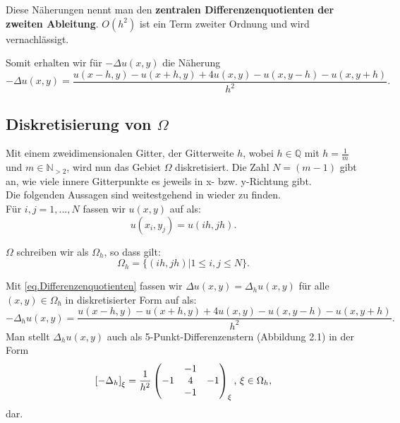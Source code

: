 Diese Näherungen nennt man den \textbf{zentralen Differenzenquotienten der zweiten Ableitung}. $O(h^{2})$ ist ein Term zweiter Ordnung und wird vernachlässigt.

Somit erhalten wir für $-\Delta u(x,y)$ die Näherung
\begin{equation}
-\Delta u(x,y) = \frac {u(x-h,y) - u(x+h,y) + 4u(x,y) - u(x,y-h) - u(x,y+h)} {h^{2}}.\label{eq.Differenzenquotienten}
\end{equation}

\subsection{Diskretisierung von $\Omega$}\label{ss.Diskretisierung}

Mit einem zweidimensionalen Gitter, der Gitterweite $h$, wobei $h \in \mathbb{Q}$ mit $h = \frac {1} {m}$ und $m \in \mathbb{N}_{>2}$, wird nun das Gebiet $\Omega$ diskretisiert. Die Zahl $N = (m-1)$ gibt an, wie viele innere Gitterpunkte es jeweils in x- bzw. y-Richtung gibt.\\
Die folgenden Aussagen sind weitestgehend in \cite{DR1} wieder zu finden.\\

Für $i,j = 1,...,N$ fassen wir $u(x,y)$ auf als:
\begin{equation}
u(x_{i},y_{j}) = u(ih,jh).
\end{equation}

$\Omega$ schreiben wir als $\Omega_{h}$, so dass gilt:
\begin{equation}
\Omega_{h} = \{(ih, jh) | 1 \le i,j \le N\}.
\end{equation}

\label{img.5-Point-Star}

Mit \autoref{eq.Differenzenquotienten} fassen wir $\Delta u(x,y) = \Delta_{h} u(x,y)$ für alle $(x,y) \in \Omega_{h}$ in diskretisierter Form auf als:
\begin{equation}
-\Delta_{h} u(x,y) = \frac {u(x-h,y) - u(x+h,y) + 4u(x,y) - u(x,y-h) - u(x,y+h)} {h^{2}}.\label{eq.5-Point-Star}
\end{equation}
Man stellt $\Delta_{h} u(x,y)$ auch als 5-Punkt-Differenzenstern (Abbildung 2.1) in der Form
\begin{equation}
\left[-\Delta_{h}\right]_{\xi} = \frac {1} {h^{2}}
\begin{pmatrix}
  & -1 & \\
-1 & 4 & -1 \\
  & -1 & 
\end{pmatrix}_{\xi}
\textnormal{, } \xi \in \Omega_{h},
\end{equation}
dar.

